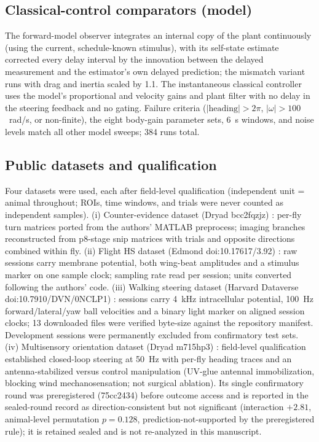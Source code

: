 \documentclass[pdflatex,sn-nature]{sn-jnl}
\begin{document}
\subsection{Classical-control comparators (model)}

The forward-model observer integrates an internal copy of the plant continuously (using the current, schedule-known stimulus), with its self-state estimate corrected every delay interval by the innovation between the delayed measurement and the estimator's own delayed prediction; the mismatch variant runs with drag and inertia scaled by 1.1. The instantaneous classical controller uses the model's proportional and velocity gains and plant filter with no delay in the steering feedback and no gating. Failure criteria ($|\mathrm{heading}| > 2\pi$, $|\omega| > 100$~rad/s, or non-finite), the eight body-gain parameter sets, 6~s windows, and noise levels match all other model sweeps; 384 runs total.

\subsection{Public datasets and qualification}

Four datasets were used, each after field-level qualification (independent unit = animal throughout; ROIs, time windows, and trials were never counted as independent samples). (i) Counter-evidence dataset (Dryad bcc2fqzjz) \cite{tanaka2023neural}: per-fly turn matrices ported from the authors' MATLAB preprocess; imaging branches reconstructed from p8-stage snip matrices with trials and opposite directions combined within fly. (ii) Flight HS dataset (Edmond doi:10.17617/3.92) \cite{fischer2022multiple}: raw sessions carry membrane potential, both wing-beat amplitudes and a stimulus marker on one sample clock; sampling rate read per session; units converted following the authors' code. (iii) Walking steering dataset (Harvard Dataverse doi:10.7910/DVN/0NCLP1) \cite{rayshubskiy2025neural}: sessions carry 4~kHz intracellular potential, 100~Hz forward/lateral/yaw ball velocities and a binary light marker on aligned session clocks; 13 downloaded files were verified byte-size against the repository manifest. Development sessions were permanently excluded from confirmatory test sets. (iv) Multisensory orientation dataset (Dryad m715hp3) \cite{currier2018multisensory}: field-level qualification established closed-loop steering at 50~Hz with per-fly heading traces and an antenna-stabilized versus control manipulation (UV-glue antennal immobilization, blocking wind mechanosensation; not surgical ablation). Its single confirmatory round was preregistered (75cc2434) before outcome access and is reported in the sealed-round record as direction-consistent but not significant (interaction $+2.81$, animal-level permutation $p=0.128$, prediction-not-supported by the preregistered rule); it is retained sealed and is not re-analyzed in this manuscript.
\end{document}

